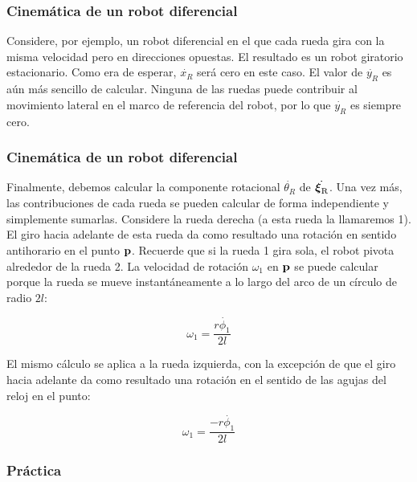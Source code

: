 \begin{frame}
    \frametitle{Cinemática de un robot diferencial}
    \small
    Considere, por ejemplo, un robot diferencial en el que cada rueda gira con la misma velocidad pero en direcciones opuestas. El resultado es un robot giratorio estacionario. Como era de esperar, $\dot{x_R}$ será cero en este caso. El valor de $\dot{y_R}$ es aún más sencillo de calcular. Ninguna de las ruedas puede contribuir al movimiento lateral en el marco de referencia del robot, por lo que $\dot{y_R}$ es siempre cero.
\end{frame}

\begin{frame}
    \frametitle{Cinemática de un robot diferencial}
    \small

    Finalmente, debemos calcular la componente rotacional $\dot{\theta_R}$ de $\dot{\prescript{\mathrm{}}{}{{\boldsymbol{\mathbf{\xi}}}_\mathrm{R}}}$. Una vez más, las contribuciones de cada rueda se pueden calcular de forma independiente y simplemente sumarlas. Considere la rueda derecha (a esta rueda la llamaremos 1). El giro hacia adelante de esta rueda da como resultado una rotación en sentido antihorario en el punto $\boldsymbol{\mathbf{p}}$. Recuerde que si la rueda 1 gira sola, el robot pivota alrededor de la rueda 2. La velocidad de rotación $\omega_{1}$ en $\boldsymbol{\mathbf{p}}$ se puede calcular porque la rueda se mueve instantáneamente a lo largo del arco de un círculo de radio $2l$:

    \begin{equation*}
        \omega_{1} = \dfrac{r\dot{\phi_{1}}}{2l}
    \end{equation*}

    El mismo cálculo se aplica a la rueda izquierda, con la excepción de que el giro hacia adelante da como resultado una rotación en el sentido de las agujas del reloj en el punto:

    \begin{equation*}
        \omega_{1} = \dfrac{-r\dot{\phi_{1}}}{2l}
    \end{equation*}
\end{frame}

\begin{frame}
    \frametitle{Práctica}
\end{frame}
